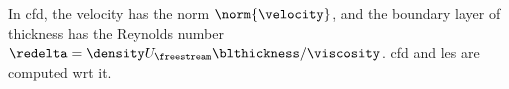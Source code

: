 \documentclass{article}
\begin{document}
In \ac{cfd}, the velocity \velocity{} has the norm $\norm{\velocity}$, and the boundary layer
of thickness \blthickness{} has the Reynolds number $\redelta = \density U_{\freestream}
\blthickness / \viscosity$. \Ac{cfd} and \ac{les} are computed \ac{wrt} it.

\notationnomenclature
\printnomenclature
\notationacronyms
\end{document}
